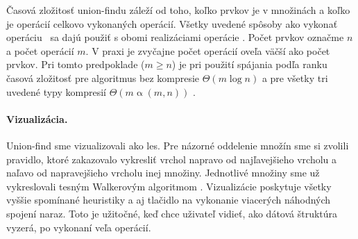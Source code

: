 \bigskip
Časová zložitosť union-findu záleží od toho, koľko prvkov je v množinách a koľko je 
operácií celkovo vykonaných operácií. Všetky uvedené spôsoby ako vykonať 
operáciu \find\ sa dajú použiť s obomi realizáciami operácie \union. 
Počet prvkov označme $n$ a počet operácií $m$. V praxi je zvyčajne počet 
operácií oveľa väčší ako počet prvkov. Pri tomto predpoklade ($m\geq n$) je 
pri použití spájania podľa ranku časová zložitosť pre algoritmus bez kompresie 
$\Theta(m\log n)$ a pre všetky tri uvedené typy kompresií 
$\Theta(m\mathop{\alpha}(m,n))$ \citep{paths2}.

\paragraph{Vizualizácia.} Union-find sme vizualizovali ako les. Pre názorné 
oddelenie množín sme si zvolili pravidlo, ktoré zakazovalo vykresliť vrchol 
napravo od najľavejšieho vrcholu a naľavo od napravejšieho vrcholu inej 
množiny. Jednotlivé množiny sme už vykreslovali tesným Walkerovým algoritmom 
\citep{walker}. Vizualizácie poskytuje všetky vyššie spomínané heuristiky a 
aj tlačidlo na vykonanie viacerých náhodných spojení naraz. Toto je užitočné, 
keď chce uživateľ vidieť, ako dátová štruktúra vyzerá, po vykonaní 
veľa operácií.




